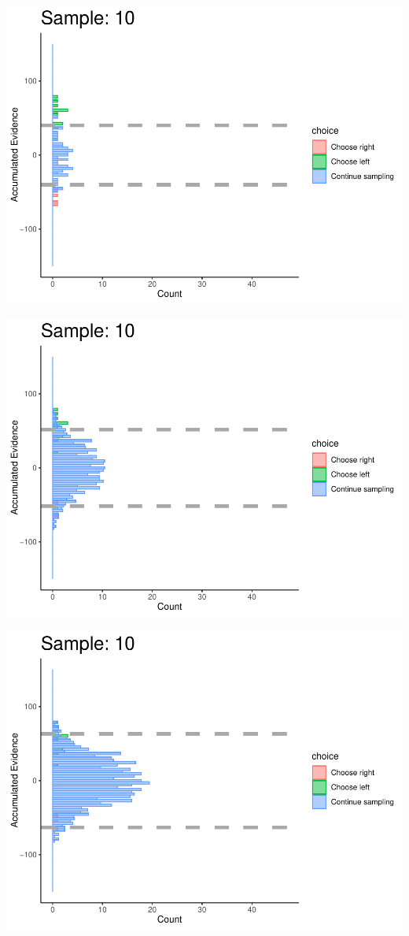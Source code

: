 \documentclass[
]{book}
\begin{document}
\begin{center}\includegraphics[width=0.8\linewidth]{LateNightBayes_files/figure-latex/collapsing_check-95} \end{center}

\begin{center}\includegraphics[width=0.8\linewidth]{LateNightBayes_files/figure-latex/collapsing_check-96} \end{center}

\begin{center}\includegraphics[width=0.8\linewidth]{LateNightBayes_files/figure-latex/collapsing_check-97} \end{center}
\end{document}
